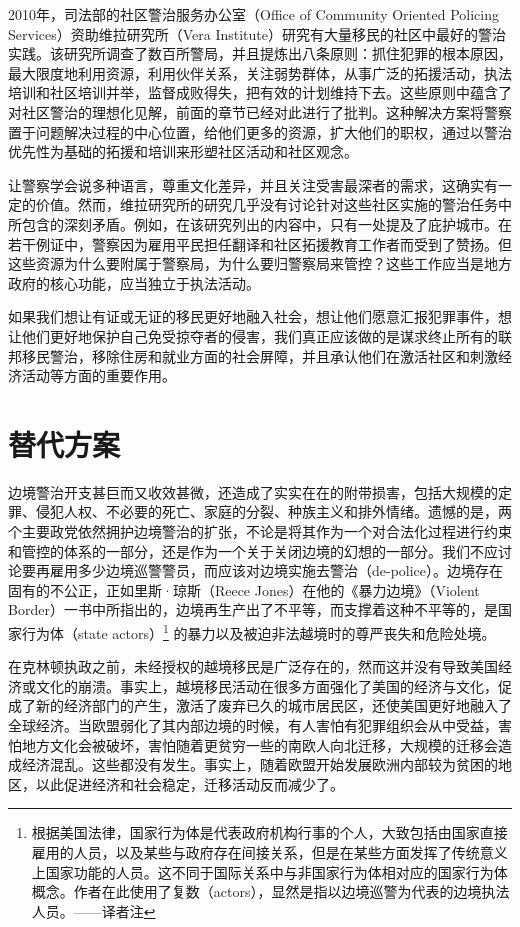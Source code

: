 \documentclass[fontset=fandol, a4paper, 12pt, openright]{ctexbook}
\begin{document}
2010年，司法部的社区警治服务办公室（Office of Community Oriented Policing Services）资助维拉研究所（Vera Institute）研究有大量移民的社区中最好的警治实践。该研究所调查了数百所警局，并且提炼出八条原则：抓住犯罪的根本原因，最大限度地利用资源，利用伙伴关系，关注弱势群体，从事广泛的拓援活动，执法培训和社区培训并举，监督成败得失，把有效的计划维持下去。这些原则中蕴含了对社区警治的理想化见解，前面的章节已经对此进行了批判。这种解决方案将警察置于问题解决过程的中心位置，给他们更多的资源，扩大他们的职权，通过以警治优先性为基础的拓援和培训来形塑社区活动和社区观念。

让警察学会说多种语言，尊重文化差异，并且关注受害最深者的需求，这确实有一定的价值。然而，维拉研究所的研究几乎没有讨论针对这些社区实施的警治任务中所包含的深刻矛盾。例如，在该研究列出的内容中，只有一处提及了庇护城市。在若干例证中，警察因为雇用平民担任翻译和社区拓援教育工作者而受到了赞扬。但这些资源为什么要附属于警察局，为什么要归警察局来管控？这些工作应当是地方政府的核心功能，应当独立于执法活动。

如果我们想让有证或无证的移民更好地融入社会，想让他们愿意汇报犯罪事件，想让他们更好地保护自己免受掠夺者的侵害，我们真正应该做的是谋求终止所有的联邦移民警治，移除住房和就业方面的社会屏障，并且承认他们在激活社区和刺激经济活动等方面的重要作用。

\section{替代方案}

边境警治开支甚巨而又收效甚微，还造成了实实在在的附带损害，包括大规模的定罪、侵犯人权、不必要的死亡、家庭的分裂、种族主义和排外情绪。遗憾的是，两个主要政党依然拥护边境警治的扩张，不论是将其作为一个对合法化过程进行约束和管控的体系的一部分，还是作为一个关于关闭边境的幻想的一部分。我们不应讨论要再雇用多少边境巡警警员，而应该对边境实施去警治（de-police）。边境存在固有的不公正，正如里斯·琼斯（Reece Jones）在他的《暴力边境》（Violent Border）一书中所指出的，边境再生产出了不平等，而支撑着这种不平等的，是国家行为体（state actors）\footnote{根据美国法律，国家行为体是代表政府机构行事的个人，大致包括由国家直接雇用的人员，以及某些与政府存在间接关系，但是在某些方面发挥了传统意义上国家功能的人员。这不同于国际关系中与非国家行为体相对应的国家行为体概念。作者在此使用了复数（actors），显然是指以边境巡警为代表的边境执法人员。——译者注} 的暴力以及被迫非法越境时的尊严丧失和危险处境。

在克林顿执政之前，未经授权的越境移民是广泛存在的，然而这并没有导致美国经济或文化的崩溃。事实上，越境移民活动在很多方面强化了美国的经济与文化，促成了新的经济部门的产生，激活了废弃已久的城市居民区，还使美国更好地融入了全球经济。当欧盟弱化了其内部边境的时候，有人害怕有犯罪组织会从中受益，害怕地方文化会被破坏，害怕随着更贫穷一些的南欧人向北迁移，大规模的迁移会造成经济混乱。这些都没有发生。事实上，随着欧盟开始发展欧洲内部较为贫困的地区，以此促进经济和社会稳定，迁移活动反而减少了。
\end{document}
